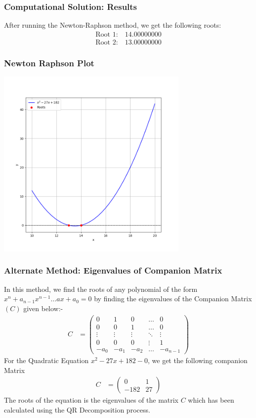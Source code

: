 \documentclass{beamer}
\providecommand{\brak}[1]{\ensuremath{\left(#1\right)}}
\theoremstyle{remark}
\newcommand{\myvec}[1]{\ensuremath{\begin{pmatrix}#1\end{pmatrix}}}
\begin{document}
\begin{frame}
    \frametitle{Computational Solution: Results}
    After running the Newton-Raphson method, we get the following roots:
    \begin{align}
        \text{Root 1:} & \ 14.00000000 \\
        \text{Root 2:} & \ 13.00000000
    \end{align}
\end{frame}
\begin{frame}
\frametitle{Newton Raphson Plot}
    \begin{center}
   \includegraphics[width=0.7\textwidth]{plots/plot1.png}
    \end{center}
\end{frame}

\begin{frame}
    \frametitle{Alternate Method: Eigenvalues of Companion Matrix}
   In this method, we find the roots of any polynomial of the form $x^n + a_{n-1}x^{n-1}\dots ax+a_0=0$ by finding the eigenvalues of the Companion Matrix $\brak{C}$ given below:-\\
\begin{align}
    C &= \myvec{0&1&0&\dots&0\\ 0&0&1&\dots&0\\ \vdots &\vdots &\vdots &\ddots&\vdots\\0&0&0&\vdots&1\\-a_0&-a_1&-a_2&\dots&-a_{n-1}}
\end{align}
For the Quadratic Equation $x^2-27x+182-0$, we get the following companion Matrix
\begin{align}
    C&=\myvec{0&1\\-182&27}
\end{align}
The roots of the equation is the eigenvalues of the matrix $C$ which has been calculated using the QR Decomposition process.
\end{frame}
\end{document}
